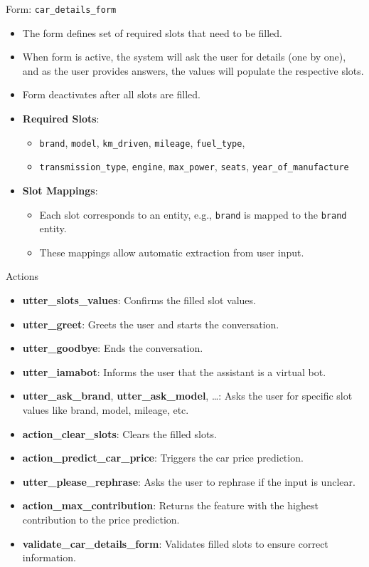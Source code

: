 \documentclass{beamer}
\begin{document}
\begin{frame}{Form: \texttt{car\_details\_form}}
	\begin{itemize}
		\item The form defines set of required slots that need to be filled.
		\item When form is active, the system will ask the user for details (one by one), and as the user provides answers, the values will populate the respective slots.
		\item Form deactivates after all slots are filled.
		\item \textbf{Required Slots}:
		\begin{itemize}
			\item \texttt{brand}, \texttt{model}, \texttt{km\_driven}, \texttt{mileage}, \texttt{fuel\_type}, 
			\item \texttt{transmission\_type}, \texttt{engine}, \texttt{max\_power}, \texttt{seats}, \texttt{year\_of\_manufacture}
		\end{itemize}
		\item \textbf{Slot Mappings}:
		\begin{itemize}
			\item Each slot corresponds to an entity, e.g., \texttt{brand} is mapped to the \texttt{brand} entity.
			\item These mappings allow automatic extraction from user input.
		\end{itemize}
	\end{itemize}
\end{frame}

\begin{frame}{Actions}
	\begin{itemize}
		\item \textbf{utter\_slots\_values}: Confirms the filled slot values.
		\item \textbf{utter\_greet}: Greets the user and starts the conversation.
		\item \textbf{utter\_goodbye}: Ends the conversation.
		\item \textbf{utter\_iamabot}: Informs the user that the assistant is a virtual bot.
		\item \textbf{utter\_ask\_brand}, \textbf{utter\_ask\_model}, \dots : Asks the user for specific slot values like brand, model, mileage, etc.
		\item \textbf{action\_clear\_slots}: Clears the filled slots.
		\item \textbf{action\_predict\_car\_price}: Triggers the car price prediction.
		\item \textbf{utter\_please\_rephrase}: Asks the user to rephrase if the input is unclear.
		\item \textbf{action\_max\_contribution}: Returns the feature with the highest contribution to the price prediction.
		\item \textbf{validate\_car\_details\_form}: Validates filled slots to ensure correct information.
	\end{itemize}
\end{frame}
\end{document}
